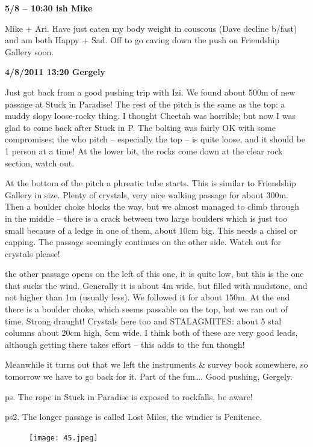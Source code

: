 \textbf{5/8 -- 10:30 ish Mike}

Mike + Ari. Have just eaten my body weight in couscous (Dave decline
b/fast) and am both Happy + Sad. Off to go caving down the push on
Friendship Gallery soon.

\textbf{4/8/2011 13:20 Gergely}

Just got back from a good pushing trip with Izi. We found about 500m of
new passage at Stuck in Paradise! The rest of the pitch is the same as
the top: a muddy slopy loose-rocky thing. I thought Cheetah was
horrible; but now I was glad to come back after Stuck in P. The bolting
was fairly OK with some compromises; the who pitch -- especially the top
-- is quite loose, and it should be 1 person at a time! At the lower
bit, the rocks come down at the clear rock section, watch out.

At the bottom of the pitch a phreatic tube starts. This is similar to
Friendship Gallery in size. Plenty of crystals, very nice walking
passage for about 300m. Then a boulder choke blocks the way, but we
almost managed to climb through in the middle -- there is a crack
between two large boulders which is just too small because of a ledge in
one of them, about 10cm big. This needs a chisel or capping. The passage
seemingly continues on the other side. Watch out for crystals please!

the other passage opens on the left of this one, it is quite low, but
this is the one that sucks the wind. Generally it is about 4m wide, but
filled with mudstone, and not higher than 1m (usually less). We followed
it for about 150m. At the end there is a boulder choke, which seems
passable on the top, but we ran out of time. Strong draught! Crystals
here too and STALAGMITES: about 5 stal columns about 20cm high, 5cm
wide. I think both of these are very good leads, although getting there
takes effort -- this adds to the fun though!

Meanwhile it turns out that we left the instruments \& survey book
somewhere, so tomorrow we have to go back for it. Part of the
fun\ldots{}. Good pushing, Gergely.

ps. The rope in Stuck in Paradise is exposed to rockfalls, be aware!

ps2. The longer passage is called Lost Miles, the windier is Penitence.

\begin{figure}[htbp]
\centering
\texttt{[image: 45.jpeg]}
\caption{}
\end{figure}

